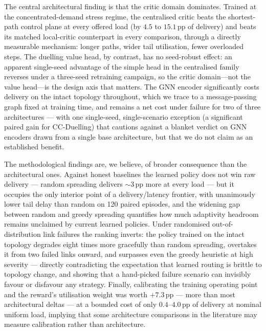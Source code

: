 \documentclass[10pt,journal,comsoc]{IEEEtran}
\begin{document}
The central architectural finding is that the critic domain dominates. Trained at the concentrated-demand stress regime, the centralised critic beats the shortest-path control plane at every offered load (by $4.5$ to $15.1$\,pp of delivery) and beats its matched local-critic counterpart in every comparison, through a directly measurable mechanism: longer paths, wider tail utilisation, fewer overloaded steps. The duelling value head, by contrast, has no seed-robust effect: an apparent single-seed advantage of the simple head in the centralised family reverses under a three-seed retraining campaign, so the critic domain---not the value head---is the design axis that matters. The GNN encoder significantly costs delivery on the intact topology throughout, which we trace to a message-passing graph fixed at training time, and remains a net cost under failure for two of three architectures --- with one single-seed, single-scenario exception (a significant paired gain for CC-Duelling) that cautions against a blanket verdict on GNN encoders drawn from a single base architecture, but that we do not claim as an established benefit.

The methodological findings are, we believe, of broader consequence than the architectural ones. Against honest baselines the learned policy does not win raw delivery --- random spreading delivers ${\sim}3$\,pp more at every load --- but it occupies the only interior point of a delivery/latency frontier, with unanimously lower tail delay than random on 120 paired episodes, and the widening gap between random and greedy spreading quantifies how much adaptivity headroom remains unclaimed by current learned policies. Under randomised out-of-distribution link failures the ranking inverts: the policy trained on the intact topology degrades eight times more gracefully than random spreading, overtakes it from two failed links onward, and surpasses even the greedy heuristic at high severity --- directly contradicting the expectation that learned routing is brittle to topology change, and showing that a hand-picked failure scenario can invisibly favour or disfavour any strategy. Finally, calibrating the training operating point and the reward's utilisation weight was worth $+7.3$\,pp --- more than most architectural deltas --- at a bounded cost of only $0.4$--$4.0$\,pp of delivery at nominal uniform load, implying that some architecture comparisons in the literature may measure calibration rather than architecture.
\end{document}
